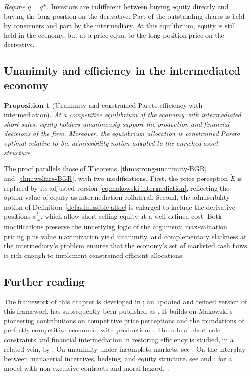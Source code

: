 \documentclass[11pt,a4paper,oneside]{book}
\theoremstyle{plain}
\newtheorem{proposition}[theorem]{Proposition}
\theoremstyle{definition}
\theoremstyle{remark}
\numberwithin{equation}{chapter}
\begin{document}
\emph{Regime $q = q^+$.}
Investors are indifferent between buying equity directly and buying the long position on the derivative.
Part of the outstanding shares is held by consumers and part by the intermediary.
At this equilibrium, equity is still held in the economy, but at a price equal to the long-position price on the derivative.

\subsection{Unanimity and efficiency in the intermediated economy}

\begin{proposition}[Unanimity and constrained Pareto efficiency with intermediation]\label{prop:intermediated-unanimity}
At a competitive equilibrium of the economy with intermediated short sales, \emph{equity holders} unanimously support the production and financial decisions of the firm.
Moreover, the equilibrium allocation is constrained Pareto optimal relative to the admissibility notion adapted to the enriched asset structure.
\end{proposition}

The proof parallels those of Theorems~\ref{thm:strong-unanimity-BGR} and~\ref{thm:welfare-BGR}, with two modifications.
First, the price perception $\widetilde{E}$ is replaced by its adjusted version \eqref{eq:makowski-intermediation}, reflecting the option value of equity as intermediation collateral.
Second, the admissibility notion of Definition~\ref{def:admissible-alloc} is enlarged to include the derivative positions $\phi^i_\pm$, which allow short-selling equity at a well-defined cost.
Both modifications preserve the underlying logic of the argument: max-valuation pricing plus value maximization yield unanimity, and complementary slackness at the intermediary's problem ensures that the economy's set of marketed cash flows is rich enough to implement constrained-efficient allocations.

\subsection{Further reading}

The framework of this chapter is developed in \citet{BisinGottardiRuta2014}; an updated and refined version of this framework has subsequently been published as \citet{BisinClementiGottardi2025}.
It builds on Makowski's pioneering contributions on competitive price perceptions and the foundations of perfectly competitive economies with production: \citet{Makowski1980, Makowski1983a, Makowski1983b}.
The role of short-sale constraints and financial intermediation in restoring efficiency is studied, in a related vein, by \citet{AllenGale1991}.
On unanimity under incomplete markets, see \citet{CarcelesCoenPirani2009}.
On the interplay between managerial incentives, hedging, and equity structure, see \citet{AcharyaBisin2009} and \citet{BisinGottardiRampini2008}; for a model with non-exclusive contracts and moral hazard, \citet{BisinGuaitoli2004}.
\end{document}
